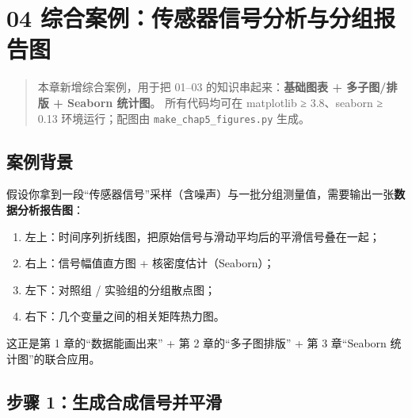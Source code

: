 \section{04
综合案例：传感器信号分析与分组报告图}\label{ux7efcux5408ux6848ux4f8bux4f20ux611fux5668ux4fe1ux53f7ux5206ux6790ux4e0eux5206ux7ec4ux62a5ux544aux56fe}

\begin{quote}
本章新增综合案例，用于把 01--03 的知识串起来：\textbf{基础图表 +
多子图/排版 + Seaborn 统计图}。 所有代码均可在 matplotlib ≥ 3.8、seaborn
≥ 0.13 环境运行；配图由 \texttt{make\_chap5\_figures.py} 生成。
\end{quote}

\subsection{案例背景}\label{ux6848ux4f8bux80ccux666f-2}

假设你拿到一段``传感器信号''采样（含噪声）与一批分组测量值，需要输出一张\textbf{数据分析报告图}：

\begin{enumerate}
\def\labelenumi{\arabic{enumi}.}
\tightlist
\item
  左上：时间序列折线图，把原始信号与滑动平均后的平滑信号叠在一起；
\item
  右上：信号幅值直方图 + 核密度估计（Seaborn）；
\item
  左下：对照组 / 实验组的分组散点图；
\item
  右下：几个变量之间的相关矩阵热力图。
\end{enumerate}

这正是第 1 章的``数据能画出来'' + 第 2 章的``多子图排版'' + 第 3
章``Seaborn 统计图''的联合应用。

\subsection{步骤
1：生成合成信号并平滑}\label{ux6b65ux9aa4-1ux751fux6210ux5408ux6210ux4fe1ux53f7ux5e76ux5e73ux6ed1}

